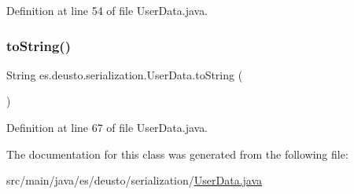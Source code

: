 Definition at line 54 of file User\+Data.\+java.

\mbox{\label{classes_1_1deusto_1_1serialization_1_1_user_data_ac2a905aeaf972596d8fd135d76c763cd}} 
\subsubsection{\texorpdfstring{to\+String()}{toString()}}
{\footnotesize\ttfamily String es.\+deusto.\+serialization.\+User\+Data.\+to\+String (\begin{DoxyParamCaption}{ }\end{DoxyParamCaption})}



Definition at line 67 of file User\+Data.\+java.



The documentation for this class was generated from the following file\+:\begin{DoxyCompactItemize}
\item 
src/main/java/es/deusto/serialization/\hyperlink{_user_data_8java}{User\+Data.\+java}\end{DoxyCompactItemize}

